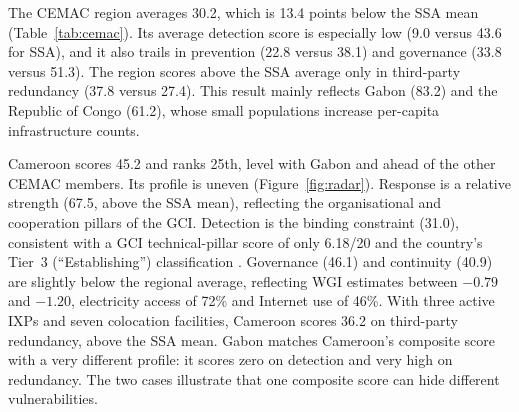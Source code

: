 \documentclass[fintech,article,submit,pdftex,moreauthors]{Definitions/mdpi}
\begin{document}
The CEMAC region averages 30.2, which is 13.4 points below the SSA mean (Table~\ref{tab:cemac}). Its average detection score is especially low (9.0 versus 43.6 for SSA), and it also trails in prevention (22.8 versus 38.1) and governance (33.8 versus 51.3). The region scores above the SSA average only in third-party redundancy (37.8 versus 27.4). This result mainly reflects Gabon (83.2) and the Republic of Congo (61.2), whose small populations increase per-capita infrastructure counts.

Cameroon scores 45.2 and ranks 25th, level with Gabon and ahead of the other CEMAC members. Its profile is uneven (Figure~\ref{fig:radar}). Response is a relative strength (67.5, above the SSA mean), reflecting the organisational and cooperation pillars of the GCI. Detection is the binding constraint (31.0), consistent with a GCI technical-pillar score of only 6.18/20 and the country's Tier~3 (``Establishing'') classification \citep{ITU2024GCI}. Governance (46.1) and continuity (40.9) are slightly below the regional average, reflecting WGI estimates between $-0.79$ and $-1.20$, electricity access of 72\% and Internet use of 46\%. With three active IXPs and seven colocation facilities, Cameroon scores 36.2 on third-party redundancy, above the SSA mean. Gabon matches Cameroon's composite score with a very different profile: it scores zero on detection and very high on redundancy. The two cases illustrate that one composite score can hide different vulnerabilities.
\end{document}
